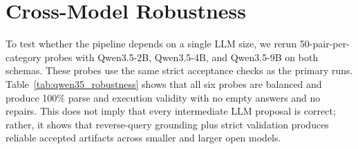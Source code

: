 \documentclass[11pt]{article}
\begin{document}
\begin{table}[t]
  \centering
  \scriptsize
  \caption{Natural-language diversity and SPARQL structural diagnostics for strict accepted Phase-3 artifacts. Dist-1/2 are corpus-level distinct unigram/bigram percentages. Per-category diagnostics are in Appendix Table~\ref{tab:app_structural_diagnostics}.}
  \label{tab:linguistic_structural}
\end{table}

\section{Cross-Model Robustness}
\label{sec:arr_scale}
To test whether the pipeline depends on a single LLM size, we rerun 50-pair-per-category probes with Qwen3.5-2B, Qwen3.5-4B, and Qwen3.5-9B on both schemas. These probes use the same strict acceptance checks as the primary runs. Table~\ref{tab:qwen35_robustness} shows that all six probes are balanced and produce 100\% parse and execution validity with no empty answers and no repairs. This does not imply that every intermediate LLM proposal is correct; rather, it shows that reverse-query grounding plus strict validation produces reliable accepted artifacts across smaller and larger open models.

\begin{table}[t]
  \centering
  \small
  \caption{Cross-model generation robustness probes at 50 pairs per category per schema.}
  \label{tab:qwen35_robustness}
\end{table}
\end{document}
